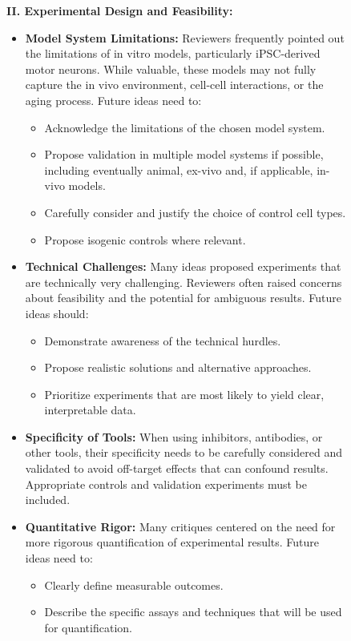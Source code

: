 \begin{figure}[htbp!]
\begin{tcolorbox}
\textbf{II. Experimental Design and Feasibility:}
\begin{itemize}
    \item \textbf{Model System Limitations:} Reviewers frequently pointed out the limitations of in vitro models, particularly iPSC-derived motor neurons. While valuable, these models may not fully capture the in vivo environment, cell-cell interactions, or the aging process. Future ideas need to:
    \begin{itemize}
        \item Acknowledge the limitations of the chosen model system.
        \item Propose validation in multiple model systems if possible, including eventually animal, ex-vivo and, if applicable, in-vivo models.
        \item Carefully consider and justify the choice of control cell types.
        \item Propose isogenic controls where relevant.
    \end{itemize}
    \item \textbf{Technical Challenges:} Many ideas proposed experiments that are technically very challenging. Reviewers often raised concerns about feasibility and the potential for ambiguous results. Future ideas should:
    \begin{itemize}
        \item Demonstrate awareness of the technical hurdles.
        \item Propose realistic solutions and alternative approaches.
        \item Prioritize experiments that are most likely to yield clear, interpretable data.
    \end{itemize}
    \item \textbf{Specificity of Tools:} When using inhibitors, antibodies, or other tools, their specificity needs to be carefully considered and validated to avoid off-target effects that can confound results. Appropriate controls and validation experiments must be included.
    \item \textbf{Quantitative Rigor:} Many critiques centered on the need for more rigorous quantification of experimental results. Future ideas need to:
    \begin{itemize}
        \item Clearly define measurable outcomes.
        \item Describe the specific assays and techniques that will be used for quantification.

\end{itemize}
\end{itemize}
\end{tcolorbox}
\end{figure}
